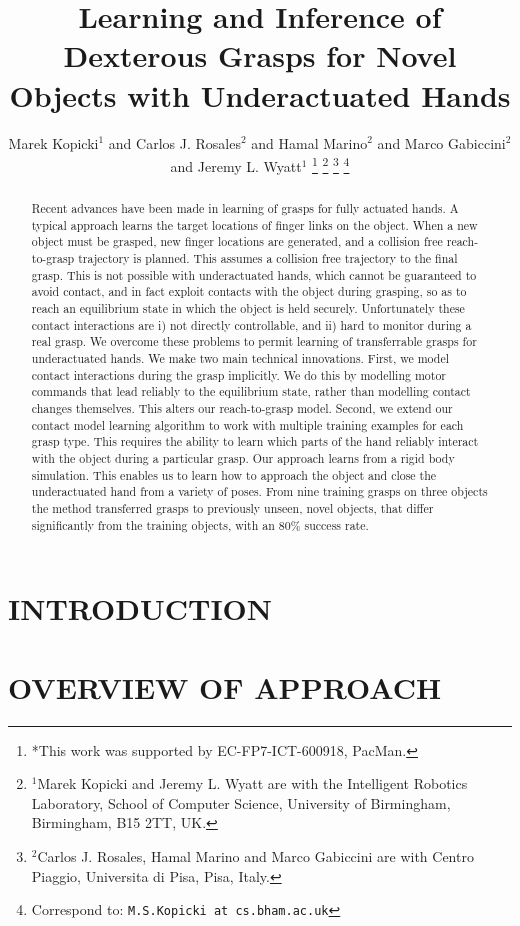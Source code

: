 \documentclass[a4paper, 10pt, conference]{ieeeconf}
\title{\LARGE \bf
Learning and Inference of Dexterous Grasps for Novel Objects with Underactuated Hands
}
\author{Marek Kopicki$^{1}$ and Carlos J. Rosales$^{2}$ and Hamal Marino$^{2}$ and Marco Gabiccini$^{2}$ and Jeremy L. Wyatt$^{1}$%
\thanks{*This work was supported by EC-FP7-ICT-600918, PacMan.}%
\thanks{$^{1}$Marek Kopicki and Jeremy L. Wyatt are with the Intelligent Robotics Laboratory, School of Computer Science,
        University of Birmingham, Birmingham, B15 2TT, UK.}
\thanks{$^{2}$Carlos J. Rosales, Hamal Marino and Marco Gabiccini are with Centro Piaggio, Universita di Pisa, Pisa, Italy.}
\thanks{Correspond to: {\tt\small M.S.Kopicki at cs.bham.ac.uk}}%
}
\begin{document}
\maketitle
\thispagestyle{empty}
\pagestyle{empty}


\begin{abstract}
Recent advances have been made in learning of grasps for fully actuated hands. A typical approach learns the target locations of finger links on the object. When a new object must be grasped, new finger locations are generated, and a collision free reach-to-grasp trajectory is planned. This assumes a collision free trajectory to the final grasp. This is not possible with underactuated hands, which cannot be guaranteed to avoid contact, and in fact exploit contacts with the object during grasping, so as to reach an equilibrium state in which the object is held securely. Unfortunately these contact interactions are i) not directly controllable, and ii) hard to monitor during a real grasp. We overcome these problems to permit learning of transferrable grasps for underactuated hands. We make two main technical innovations. First, we model contact interactions during the grasp implicitly. We do this by modelling motor commands that lead reliably to the equilibrium state, rather than modelling contact changes themselves. This alters our reach-to-grasp model. Second, we extend our contact model learning algorithm to work with multiple training examples for each grasp type. This requires the ability to learn which parts of the hand reliably interact with the object during a particular grasp. Our approach learns from a rigid body simulation. This enables us to learn how to approach the object and close the underactuated hand from a variety of poses. From nine training grasps on three objects the method transferred grasps to previously unseen, novel objects, that differ significantly from the training objects, with an 80\% success rate. 
\end{abstract}


\section{INTRODUCTION}
\label{sec:introduction}



\section{OVERVIEW OF APPROACH}
\label{sec:overview}

\end{document}
